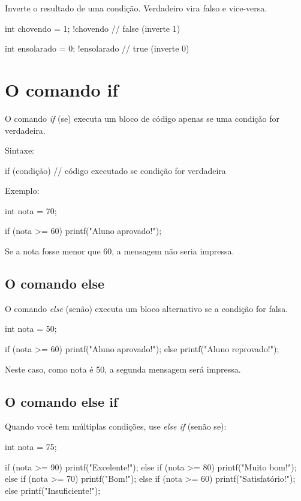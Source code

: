 Inverte o resultado de uma condição. Verdadeiro vira falso e vice-versa.

\begin{ccode}
  int chovendo = 1;
  !chovendo  // false (inverte 1)

  int ensolarado = 0;
  !ensolarado  // true (inverte 0)
\end{ccode}

\section{O comando if}

O comando \textit{if} (se) executa um bloco de código apenas se uma condição for verdadeira.

Sintaxe:

\begin{ccode}
  if (condição) {
    // código executado se condição for verdadeira
  }
\end{ccode}

Exemplo:

\begin{ccode}
  int nota = 70;

  if (nota >= 60) {
    printf("Aluno aprovado!\n");
  }
\end{ccode}

Se a nota fosse menor que 60, a mensagem não seria impressa.

\subsection{O comando else}

O comando \textit{else} (senão) executa um bloco alternativo se a condição for falsa.

\begin{ccode}
  int nota = 50;

  if (nota >= 60) {
    printf("Aluno aprovado!\n");
  } else {
    printf("Aluno reprovado!\n");
  }
\end{ccode}

Neste caso, como nota é 50, a segunda mensagem será impressa.

\subsection{O comando else if}

Quando você tem múltiplas condições, use \textit{else if} (senão se):

\begin{ccode}
  int nota = 75;

  if (nota >= 90) {
    printf("Excelente!\n");
  } else if (nota >= 80) {
    printf("Muito bom!\n");
  } else if (nota >= 70) {
    printf("Bom!\n");
  } else if (nota >= 60) {
    printf("Satisfatório!\n");
  } else {
    printf("Insuficiente!\n");
  }
\end{ccode}

